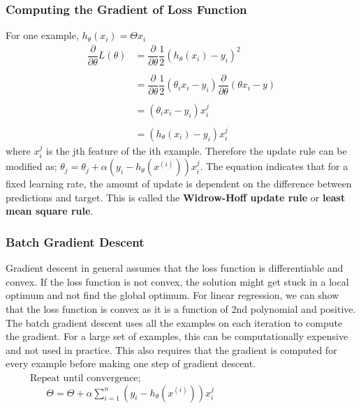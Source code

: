\documentclass[12pt,a4paper,titlepage,portrait,openany]{book}
\begin{document}
	\subsubsection{Computing the Gradient of Loss Function}
	For one example, $h_\theta(x_i) = \Theta{x_i}$
	\begin{equation*}
	\begin{array}{cl}
	\dfrac{\partial}{\partial\theta}L(\theta) &= \dfrac{\partial}{\partial\theta} \dfrac{1}{2}\left(h_\theta(x_i) - y_i\right)^2 \\
	\\
	&= \dfrac{\partial}{\partial\theta} \dfrac{1}{2}\left(\theta_i{x_i} - y_i\right)\dfrac{\partial}{\partial\theta}\left(\theta{x_i - y}\right) \\\\
	&= \left(\theta_i{x_i} - y_i\right)x_i^j \\\\
	&= \left(h_\theta(x_i) - y_i\right)x_i^j
	\end{array}
	\end{equation*} where $x_i^j$ is the jth feature of the ith example. Therefore the update rule can be modified as;
	$\theta_j = \theta_{j} + \alpha(y_i - h_\theta(x^{(i)}))x_i^j$.
	The equation indicates that for a fixed learning rate, the amount of update is dependent on the difference between predictions and target. This is called the \textbf{Widrow-Hoff update rule} or \textbf{least mean square rule}.
	
	\subsubsection{Batch Gradient Descent}
	Gradient descent in general assumes that the loss function is differentiable and convex. If the loss function is not convex, the solution might get stuck in a local optimum and not find the global optimum. For linear regression, we can show that the loss function is convex as it is a function of 2nd polynomial and positive. \\ 
	The batch gradient descent uses all the examples on each iteration to compute the gradient. For a large set of examples, this can be computationally expensive and not used in practice. This also requires that the gradient is computed for every example before making one step of gradient descent. 
	\\
	${}\hspace{30pt} \text{Repeat until convergence;} $\\
	${}\hspace{50pt} \Theta = \Theta + \alpha\sum_{i=1}^{n}\left(y_i - h_\theta(x^{(i)})\right)x_i^j $
	
\end{document}
